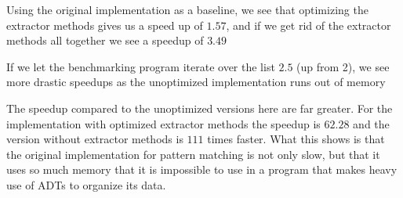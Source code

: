 \documentclass[10pt]{report}
\begin{document}
{%
\par{Using the original implementation as a baseline, we see that optimizing the extractor methods gives us a speed up of $1.57$, and if we get rid of the extractor methods all together we see a speedup of $3.49$}
\par{If we let the benchmarking program iterate over the list $2.5$ (up from 2), we see more drastic speedups as the unoptimized implementation runs out of memory}

\par{The speedup compared to the unoptimized versions here are far greater. For the implementation with optimized extractor methods the speedup is $62.28$ and the version without extractor methods is $111$ times faster. What this shows is that the original implementation for pattern matching is not only slow, but that it uses so much memory that it is impossible to use in a program that makes heavy use of ADTs to organize its data.}

}
\end{document}
